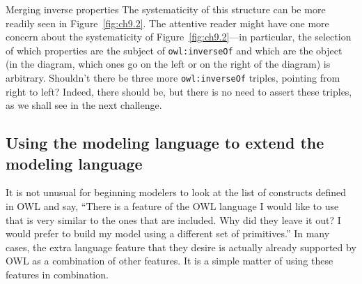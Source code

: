 \begin{challenge}{Merging inverse properties}
The systematicity of this structure can be more readily seen in Figure~\ref{fig:ch9.2}. 
The attentive reader might have one more concern about the
systematicity of Figure~\ref{fig:ch9.2}---in particular, the selection of which
properties are the subject of \texttt{owl:inverseOf} and which are the object (in
the diagram, which ones go on the left or on the right of the diagram)
is arbitrary. Shouldn't there be three more \texttt{owl:inverseOf} triples,
pointing from right to left? Indeed, there should be, but there is no
need to assert these triples, as we shall see in the next challenge.
\end{challenge}


\subsection{Using the modeling language to extend the modeling language}

It is not unusual for beginning modelers to look at the list of
constructs defined in OWL and say, ``There is a feature of the OWL
language I would like to use that is very similar to the ones that are
included. Why did they leave it out? I would prefer to build my model
using a different set of primitives.'' In many cases, the extra language
feature that they desire is actually already supported by OWL as a
combination of other features. It is a simple matter of using these
features in combination.

